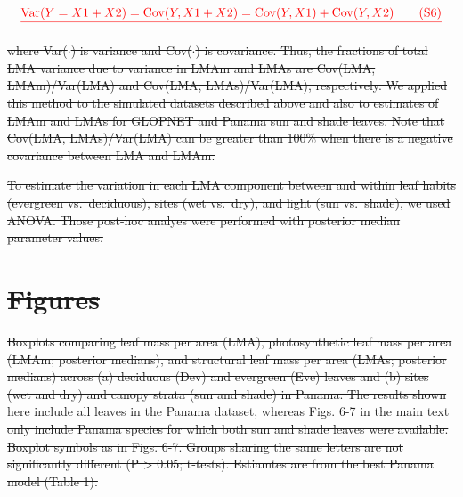 \documentclass[
  12pt,
  letterpaper,
  DIV=11,
  numbers=noendperiod]{scrartcl}
\numberwithin{equation}{section} %
\providecommand{\DIFdel}[1]{{\protect\color{red}\sout{#1}}}                      %
\begin{document}
\[
\DIFdel{\mathrm{Var}(Y = X1 + X2) = \mathrm{Cov}(Y, X1+X2) = \mathrm{Cov}(Y,X1) + \mathrm{Cov}(Y,X2) \qquad(\mathrm{S}6)
}\]%

\DIFdel{where Var(\(\cdot\)) is variance and Cov(\(\cdot\)) is covariance. Thus,
the fractions of total LMA variance due to variance in LMAm and LMAs are
Cov(LMA, LMAm)/Var(LMA) and Cov(LMA, LMAs)/Var(LMA), respectively. We
applied this method to the simulated datasets described above and also
to estimates of LMAm and LMAs for GLOPNET and Panama sun and shade
leaves. Note that Cov(LMA, LMAs)/Var(LMA) can be greater than 100\% when
there is a negative covariance between LMA and LMAm.
}%

\DIFdel{To estimate the variation in each LMA component between and within leaf
habits (evergreen vs.~deciduous), sites (wet vs.~dry), and light (sun
vs.~shade), we used ANOVA. Those post-hoc analyes were performed with
posterior median parameter values.
}%


\section{\DIFdel{Figures}}%
\addtocounter{section}{-1}%





{%
\DIFdel{Boxplots comparing leaf mass per area
(LMA), photosynthetic leaf mass per area (LMAm; posterior medians), and
structural leaf mass per area (LMAs; posterior medians) across (a)
deciduous (Dev) and evergreen (Eve) leaves and (b) sites (wet and dry)
and canopy strata (sun and shade) in Panama. The results shown here
include all leaves in the Panama dataset, whereas Figs. 6-7 in the main
text only include Panama species for which both sun and shade leaves
were available. Boxplot symbols as in Figs. 6-7. Groups sharing the same
letters are not significantly different (P \textgreater{} 0.05;
t-tests). Estiamtes are from the best Panama model (Table 1).}}
\end{document}
